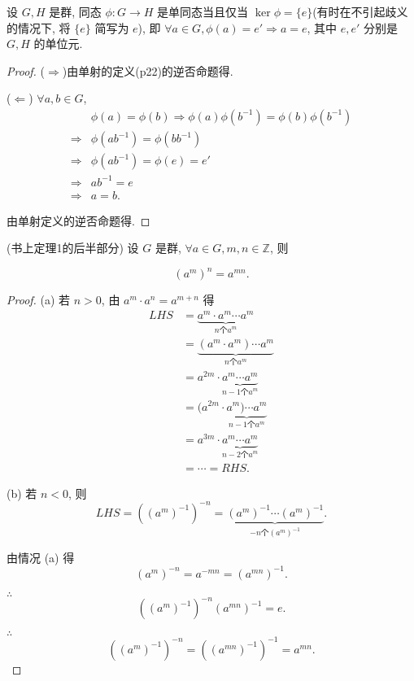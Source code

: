 \documentclass{ctexart}
\begin{document}
\begin{theorem}
    设 $G,H$ 是群, 同态 $\phi:G\to H$ 是单同态当且仅当 $\ker\phi=\{e\}$(有时在不引起歧义的情况下, 将 $\{e\}$ 简写为 $e$), 即 $\forall a\in G,\phi(a)=e'\Rightarrow a=e$, 其中 $e,e'$ 分别是 $G,H$ 的单位元.
\end{theorem}
\begin{proof}
    ($\Rightarrow$)由单射的定义(p22)的逆否命题得.

    ($\Leftarrow$) $\forall a,b\in G$,
    \begin{align*}
        & \phi(a)=\phi(b)\Rightarrow\phi(a)\phi(b^{-1})=\phi(b)\phi(b^{-1}) \\
        \Rightarrow & \phi(ab^{-1})=\phi(bb^{-1}) \\
        \Rightarrow & \phi(ab^{-1})=\phi(e)=e' \\
        \Rightarrow & ab^{-1}=e \\
        \Rightarrow & a=b.
    \end{align*}

    由单射定义的逆否命题得.
\end{proof}
\begin{theorem}(书上定理1的后半部分)
    设 $G$ 是群, $\forall a\in G,m,n\in\mathbb{Z}$, 则

    \[(a^m)^n=a^{mn}.\]
\end{theorem}
\begin{proof}
(a) 若 $n>0$, 由 $a^m\cdot a^n=a^{m+n}$ 得
\begin{align*}
    LHS & =\underbrace{a^m\cdot a^m\cdots a^m}_{n\text{个}a^m} \\
    & =\underbrace{(a^m\cdot a^m)\cdots a^m}_{n\text{个}a^m} \\
    & =a^{2m}\cdot\underbrace{a^m\cdots a^m}_{n-1\text{个}a^m} \\
    & =(a^{2m}\cdot\underbrace{a^m)\cdots a^m}_{n-1\text{个}a^m} \\
    & =a^{3m}\cdot\underbrace{a^m\cdots a^m}_{n-2\text{个}a^m} \\
    & =\cdots=RHS.
\end{align*}

(b) 若 $n<0$, 则
\[LHS=((a^m)^{-1})^{-n}=\underbrace{(a^m)^{-1}\cdots(a^m)^{-1}}_{-n\text{个}(a^m)^{-1}}.\]

由情况 (a) 得
\[(a^m)^{-n}=a^{-mn}=(a^{mn})^{-1}.\]

$\therefore$
\[((a^m)^{-1})^{-n}(a^{mn})^{-1}=e.\]

$\therefore$
\[((a^m)^{-1})^{-n}=((a^{mn})^{-1})^{-1}=a^{mn}.\]
\end{proof}
\end{document}
